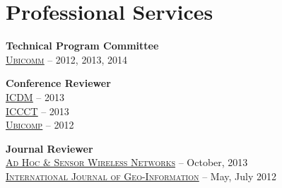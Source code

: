 \section{\sc Professional Services}
{\bf Technical Program Committee}\\
\underline{\href{http://www.iaria.org/conferences.html}{\textsc{Ubicomm}}} -- 2012, 2013, 2014

{\bf Conference Reviewer}\\
\underline{\href{http://icdm2013.rutgers.edu}{\textsc{ICDM}}} -- 2013\\
\underline{\href{http://www.mnnit.ac.in/iccct2013}{\textsc{ICCCT}}} -- 2013\\
\underline{\href{http://www.ubicomp.org/ubicomp2012}{\textsc{Ubicomp}}} -- 2012

{\bf Journal Reviewer}\\
\underline{\href{http://www.oldcitypublishing.com/AHSWN/AHSWN.html}{\textsc{Ad Hoc \& Sensor Wireless Networks}}} -- October, 2013\\
\underline{\href{http://www.mdpi.com/journal/ijgi}{\textsc{International Journal of Geo-Information}}} -- May, July 2012
